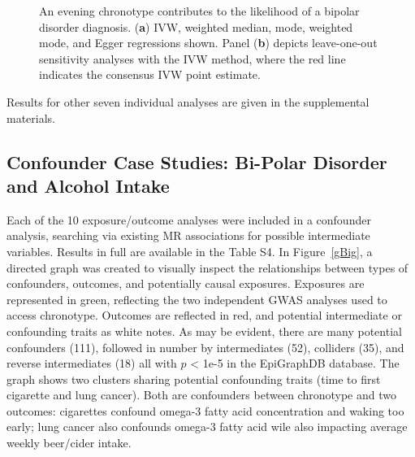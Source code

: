 \documentclass[genes,article,accept,moreauthors,pdftex]{Definitions/mdpi}
\begin{document}
\begin{figure}[H]
{\begin{subfigure}{.5\linewidth}
\caption{}
\label{bipolarrLoo}
\end{subfigure}}
\caption{An evening chronotype contributes to the likelihood of a bipolar disorder diagnosis. (\textbf{a}) IVW, weighted median, mode, weighted mode, and Egger regressions shown. Panel (\textbf{b}) depicts leave-one-out sensitivity analyses with the IVW method, where the red line indicates the consensus IVW point estimate.}
\label{bipolar}
\end{figure}

Results for other seven individual analyses are given in the supplemental materials.

\subsection{Confounder Case Studies: Bi-Polar Disorder and Alcohol Intake}
Each of the 10 exposure/outcome analyses were included in a confounder analysis, searching via existing MR associations for possible intermediate variables. Results in full are available in the {{Table S4}}. In Figure~\ref{gBig}, a directed graph was created to visually inspect the relationships between types of confounders, outcomes, and potentially causal exposures. Exposures are represented in green, reflecting the two independent GWAS analyses used to access chronotype. Outcomes are reflected in red, and potential intermediate or confounding traits as white notes. As may be evident, there are many potential confounders (111), followed in number by intermediates (52), colliders (35), and reverse intermediates (18) all with $p$ < 1e-5 in the EpiGraphDB database. The graph shows two clusters sharing potential confounding traits (time to first cigarette and lung cancer). Both are confounders between chronotype and two outcomes: cigarettes confound omega-3 fatty acid concentration and waking too early; lung cancer also confounds omega-3 fatty acid wile also impacting average weekly beer/cider intake.
\end{document}
